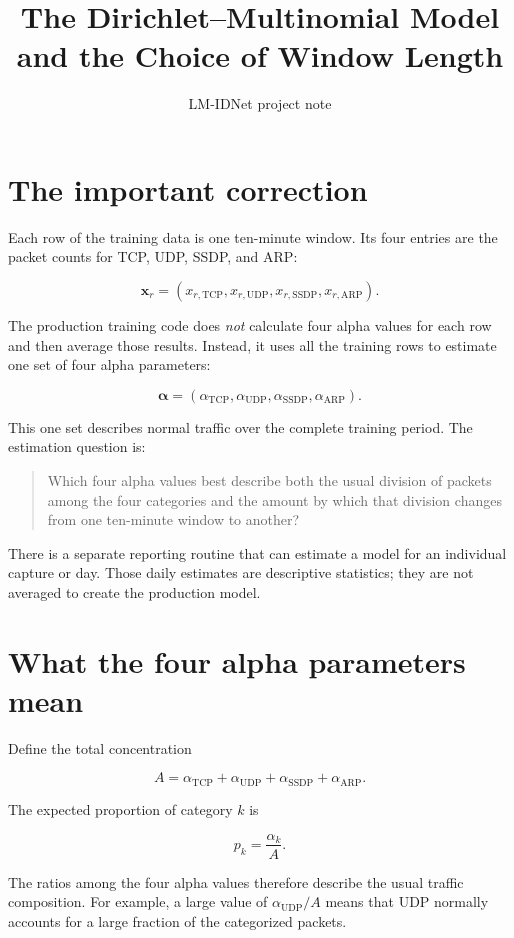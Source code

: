 \documentclass[11pt,a4paper]{article}
\title{The Dirichlet--Multinomial Model and the Choice of Window Length}
\author{LM-IDNet project note}
\date{}
\begin{document}
\maketitle

\section{The important correction}

Each row of the training data is one ten-minute window.  Its four entries are
the packet counts for TCP, UDP, SSDP, and ARP:

\[
\mathbf{x}_r =
\left(
x_{r,\mathrm{TCP}},
x_{r,\mathrm{UDP}},
x_{r,\mathrm{SSDP}},
x_{r,\mathrm{ARP}}
\right).
\]

The production training code does \emph{not} calculate four alpha values for
each row and then average those results.  Instead, it uses all the training
rows to estimate one set of four alpha parameters:

\[
\boldsymbol{\alpha}=
\left(
\alpha_{\mathrm{TCP}},
\alpha_{\mathrm{UDP}},
\alpha_{\mathrm{SSDP}},
\alpha_{\mathrm{ARP}}
\right).
\]

This one set describes normal traffic over the complete training period.  The
estimation question is:

\begin{quote}
Which four alpha values best describe both the usual division of packets among
the four categories and the amount by which that division changes from one
ten-minute window to another?
\end{quote}

There is a separate reporting routine that can estimate a model for an
individual capture or day.  Those daily estimates are descriptive statistics;
they are not averaged to create the production model.

\section{What the four alpha parameters mean}

Define the total concentration

\[
A = \alpha_{\mathrm{TCP}}+
    \alpha_{\mathrm{UDP}}+
    \alpha_{\mathrm{SSDP}}+
    \alpha_{\mathrm{ARP}}.
\]

The expected proportion of category $k$ is

\[
p_k=\frac{\alpha_k}{A}.
\]

The ratios among the four alpha values therefore describe the usual traffic
composition.  For example, a large value of
$\alpha_{\mathrm{UDP}}/A$ means that UDP normally accounts for a large fraction
of the categorized packets.
\end{document}
